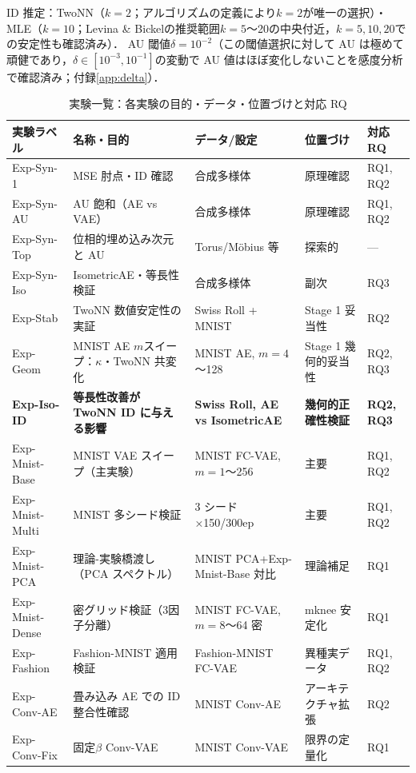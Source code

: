 \documentclass[11pt,a4paper]{jsarticle}
\begin{document}
ID 推定：TwoNN（$k=2$；アルゴリズムの定義により$k=2$が唯一の選択）・MLE（$k=10$；Levina \& Bickel\cite{levina2005mle}の推奨範囲$k=5$〜20の中央付近，$k=5,10,20$での安定性も確認済み）\cite{facco2017twonn,levina2005mle}．
AU 閾値$\delta = 10^{-2}$\cite{lucas2019elbo}（この閾値選択に対して AU は極めて頑健であり，$\delta \in [10^{-3}, 10^{-1}]$の変動で AU 値はほぼ変化しないことを感度分析で確認済み；付録\ref{app:delta}）．

\begin{table}[H]
\centering
\caption{実験一覧：各実験の目的・データ・位置づけと対応 RQ}
\label{tab:exp_list}
\small
\begin{tabular}{lllll}
\toprule
実験ラベル & 名称・目的 & データ/設定 & 位置づけ & 対応 RQ \\
\midrule
Exp-Syn-1 & MSE 肘点・ID 確認 & 合成多様体 & 原理確認 & RQ1, RQ2 \\
Exp-Syn-AU & AU 飽和（AE vs VAE） & 合成多様体 & 原理確認 & RQ1, RQ2 \\
Exp-Syn-Top & 位相的埋め込み次元と AU & Torus/Möbius 等 & 探索的 & --- \\
Exp-Syn-Iso & IsometricAE・等長性検証 & 合成多様体 & 副次 & RQ3 \\
Exp-Stab & TwoNN 数値安定性の実証 & Swiss Roll + MNIST & Stage 1 妥当性 & RQ2 \\
Exp-Geom & MNIST AE $m$スイープ：$\kappa$・TwoNN 共変化 & MNIST AE, $m=4$〜128 & Stage 1 幾何的妥当性 & RQ2, RQ3 \\
\textbf{Exp-Iso-ID} & \textbf{等長性改善が TwoNN ID に与える影響} & \textbf{Swiss Roll, AE vs IsometricAE} & \textbf{幾何的正確性検証} & \textbf{RQ2, RQ3} \\
Exp-Mnist-Base & MNIST VAE スイープ（主実験） & MNIST FC-VAE, $m=1$〜256 & 主要 & RQ1, RQ2 \\
Exp-Mnist-Multi & MNIST 多シード検証 & 3 シード×150/300ep & 主要 & RQ1, RQ2 \\
Exp-Mnist-PCA & 理論-実験橋渡し（PCA スペクトル） & MNIST PCA+Exp-Mnist-Base 対比 & 理論補足 & RQ1 \\
Exp-Mnist-Dense & 密グリッド検証（3因子分離） & MNIST FC-VAE, $m=8$〜64 密 & mknee 安定化 & RQ1 \\
Exp-Fashion & Fashion-MNIST 適用検証 & Fashion-MNIST FC-VAE & 異種実データ & RQ1, RQ2 \\
Exp-Conv-AE & 畳み込み AE での ID 整合性確認 & MNIST Conv-AE & アーキテクチャ拡張 & RQ2 \\
Exp-Conv-Fix & 固定$\beta$ Conv-VAE & MNIST Conv-VAE & 限界の定量化 & RQ1 \\

\end{tabular}
\end{table}
\end{document}
